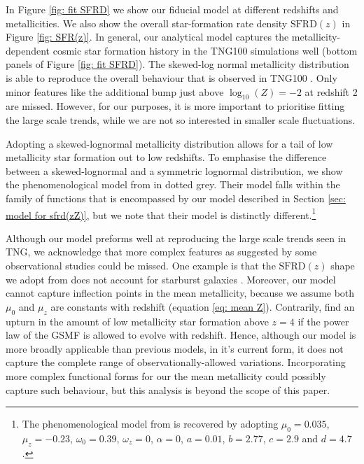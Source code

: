 \documentclass[linenumbers,twocolumn]{aastex631}
\newcommand{\SFRDz}{\ensuremath{\mathrm{SFRD}(z)}\xspace}
\begin{document}
In Figure \ref{fig: fit SFRD} we show our fiducial  model at different redshifts and metallicities. We also show the overall star-formation rate density \SFRDz in Figure \ref{fig: SFR(z)}.
In general, our analytical model captures the metallicity-dependent cosmic star formation history in the TNG100 simulations well (bottom panels of Figure \ref{fig: fit SFRD}). 
The skewed-log normal metallicity distribution is able to reproduce the overall behaviour that is observed in TNG100 \citep[bottom left panel, but cf. ][for an in-depth discussion of low metallicity star formation in the TNG50 simulation]{Pakmor+2022}.
Only minor features like the additional bump just above $\log_{10}(Z) = -2$ at redshift 2 are missed. 
However, for our purposes, it is more important to prioritise fitting the large scale trends, while we are not so interested in smaller scale fluctuations.

Adopting a skewed-lognormal metallicity distribution allows for a tail of low metallicity star formation out to low redshifts. To emphasise the difference between a skewed-lognormal and a symmetric lognormal distribution, we show the phenomenological model from \cite{Neijssel+2019} in dotted grey. Their model falls within the family of functions that is encompassed by our model described in Section \ref{sec: model for sfrd(zZ)}, but we note that their model is distinctly different.\footnote{The phenomenological model from \cite{Neijssel+2019} is recovered by adopting $\mu_0= 0.035$, $\mu_z=-0.23$, $\omega_0=0.39 $, $\omega_z = 0$, $\alpha = 0$, $a=0.01$, $b=2.77$, $c=2.9$ and $d=4.7$. }

Although our model preforms well at reproducing the large scale trends seen in TNG, we acknowledge that more complex features as suggested by some observational studies could be missed. One example is that the \SFRDz shape we adopt from \cite{MadauDickinson2014} does not account for starburst galaxies \citep[see discussion in][]{Chruslinska+2021}.
Moreover, our model cannot capture inflection points in the mean metallicity, because we assume both $\mu_0$ and $\mu_z$ are constants with redshift (equation \ref{eq: mean Z}). Contrarily, \cite{Chruslinska2019_obs} find an upturn in the amount of low metallicity star formation above $z=4$ if the power law of the GSMF is allowed to evolve with redshift.
Hence, although our model is more broadly applicable than previous models, in it's current form, it does not capture the complete range of observationally-allowed variations. 
Incorporating more complex functional forms for our the mean metallicity could possibly capture such behaviour, but this analysis is beyond the scope of this paper. 
\end{document}
